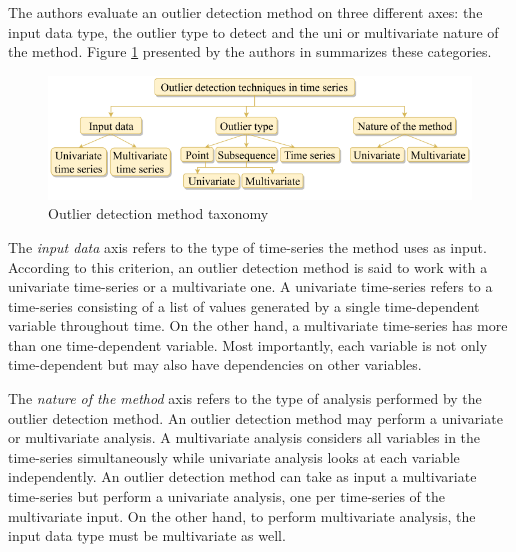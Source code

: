 The authors evaluate an outlier detection method on three different axes: the input data type, the outlier type to detect and the uni or multivariate nature of the method. Figure \ref{fig:outlier-taxonomy} presented by the authors in \cite{Blazquez-Garcia-Review-Anomaly-Detection} summarizes these categories.

\begin{figure}[!htb]
  \begin{center}
    \includegraphics[scale=0.55]{figures/outlier-method-taxonomy.png}
    \caption{Outlier detection method taxonomy}
    \label{fig:outlier-taxonomy}
  \end{center}
\end{figure}

The \textit{input data} axis refers to the type of time-series the method uses as input. According to this criterion, an outlier detection method is said to work with a univariate time-series or a multivariate one. A univariate time-series refers to a time-series consisting of a list of values generated by a single time-dependent variable throughout time. On the other hand, a multivariate time-series has more than one time-dependent variable. Most importantly, each variable is not only time-dependent but may also have dependencies on other variables. 

The \textit{nature of the method} axis refers to the type of analysis performed by the outlier detection method. An outlier detection method may perform a univariate or multivariate analysis. A multivariate analysis considers all variables in the time-series simultaneously while univariate analysis looks at each variable independently. An outlier detection method can take as input a multivariate time-series but perform a univariate analysis, one per time-series of the multivariate input. On the other hand, to perform multivariate analysis, the input data type must be multivariate as well.

